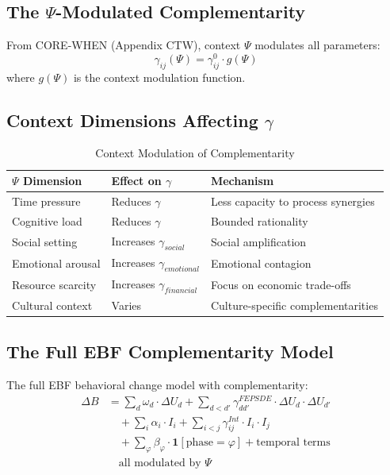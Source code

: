 \subsection{The $\Psi$-Modulated Complementarity}

From CORE-WHEN (Appendix CTW), context $\Psi$ modulates all parameters:
\begin{equation}
\gamma_{ij}(\Psi) = \gamma^0_{ij} \cdot g(\Psi)
\end{equation}
where $g(\Psi)$ is the context modulation function.

\subsection{Context Dimensions Affecting $\gamma$}

\begin{table}[h]
\centering
\caption{Context Modulation of Complementarity}
\label{tab:context-mod}
\renewcommand{\arraystretch}{1.3}
\small
\begin{tabular}{@{}p{2.5cm}p{4cm}p{5cm}@{}}
\toprule
\textbf{$\Psi$ Dimension} & \textbf{Effect on $\gamma$} & \textbf{Mechanism} \\
\midrule
Time pressure & Reduces $\gamma$ & Less capacity to process synergies \\
Cognitive load & Reduces $\gamma$ & Bounded rationality \\
Social setting & Increases $\gamma_{social}$ & Social amplification \\
Emotional arousal & Increases $\gamma_{emotional}$ & Emotional contagion \\
Resource scarcity & Increases $\gamma_{financial}$ & Focus on economic trade-offs \\
Cultural context & Varies & Culture-specific complementarities \\
\bottomrule
\end{tabular}
\end{table}

\subsection{The Full EBF Complementarity Model}

\begin{theorem}
The full EBF behavioral change model with complementarity:
\begin{align}
\Delta B &= \sum_d \omega_d \cdot \Delta U_d + \sum_{d < d'} \gamma^{FEPSDE}_{dd'} \cdot \Delta U_d \cdot \Delta U_{d'} \nonumber \\
&\quad + \sum_i \alpha_i \cdot I_i + \sum_{i < j} \gamma^{Int}_{ij} \cdot I_i \cdot I_j \nonumber \\
&\quad + \sum_\varphi \beta_\varphi \cdot \mathbf{1}[\text{phase}=\varphi] + \text{temporal terms} \nonumber \\
&\quad \text{all modulated by } \Psi
\end{align}
\end{theorem}

